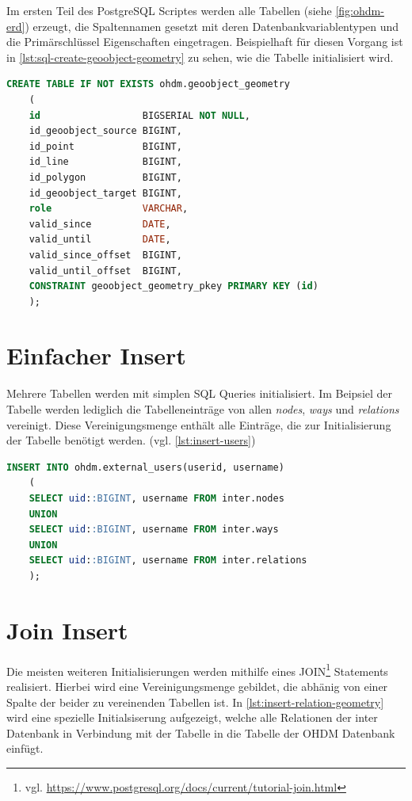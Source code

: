 Im ersten Teil des PostgreSQL Scriptes werden alle Tabellen (siehe \autoref{fig:ohdm-erd}) erzeugt, die Spaltennamen gesetzt mit deren Datenbankvariablentypen und die Primärschlüssel Eigenschaften eingetragen. Beispielhaft für diesen Vorgang ist in \autoref{lst:sql-create-geoobject-geometry} zu sehen, wie die Tabelle  initialisiert wird.\newpage

\begin{lstlisting}[language=SQL,caption={Erzeugung der \gequote{geoobject\_geometry} Tabelle},label={lst:sql-create-geoobject-geometry}]
	CREATE TABLE IF NOT EXISTS ohdm.geoobject_geometry
	(
	id                  BIGSERIAL NOT NULL,
	id_geoobject_source BIGINT,
	id_point            BIGINT,
	id_line             BIGINT,
	id_polygon          BIGINT,
	id_geoobject_target BIGINT,
	role                VARCHAR,
	valid_since         DATE,
	valid_until         DATE,
	valid_since_offset  BIGINT,
	valid_until_offset  BIGINT,
	CONSTRAINT geoobject_geometry_pkey PRIMARY KEY (id)
	);
\end{lstlisting}


\section{Einfacher Insert}
Mehrere Tabellen werden mit simplen SQL Queries initialisiert. Im Beipsiel der Tabelle  werden lediglich die Tabelleneinträge von allen \textit{nodes}, \textit{ways} und \textit{relations} vereinigt. Diese Vereinigungsmenge enthält alle Einträge, die zur Initialisierung der  Tabelle benötigt werden. (vgl. \autoref{lst:insert-users})

\begin{lstlisting}[language=SQL,caption={Insert Statement für die \gequote{external\_users} Tabelle},label={lst:insert-users}]
	INSERT INTO ohdm.external_users(userid, username) 
	(
	SELECT uid::BIGINT, username FROM inter.nodes
	UNION
	SELECT uid::BIGINT, username FROM inter.ways
	UNION
	SELECT uid::BIGINT, username FROM inter.relations
	);
\end{lstlisting}\vspace{1cm}
\section{Join Insert}
Die meisten weiteren Initialisierungen werden mithilfe eines JOIN\footnote{vgl. \url{https://www.postgresql.org/docs/current/tutorial-join.html}} Statements realisiert. Hierbei wird eine Vereinigungsmenge gebildet, die abhänig von einer Spalte der beider zu vereinenden Tabellen ist. In \autoref{lst:insert-relation-geometry} wird eine spezielle Initialsiserung aufgezeigt, welche alle Relationen der \gls{inter} Datenbank in Verbindung mit der  Tabelle in die  Tabelle der OHDM Datenbank einfügt.\newpage

